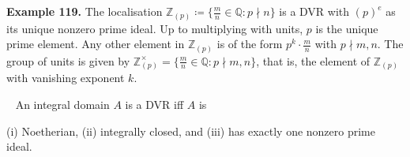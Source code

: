 \documentclass[12pt,a4paper,footinclude=true,headinclude=true]{scrbook} %
\newenvironment{proposition}[2][]
{\renewcommand\theinnercustomprop{#2}\innercustomprop[#1] 
\begin{mdframed}[backgroundcolor=gray!20]\ }
{\end{mdframed}\endinnercustomprop}
\newenvironment{example}[2][Example]
    { \begin{mdframed}[backgroundcolor=gray!20] \textbf{#1 #2.} }
    {  \end{mdframed}}
\begin{document}
\begin{example}{119}
    The localisation $\mathbb{Z}_{(p)}\coloneqq\{\frac{m}{n}\in\mathbb{Q}:p\nmid n\}$ is a DVR with $(p)^e$ as its unique nonzero prime ideal. Up to multiplying with units, $p$ is the unique prime element. Any other element in $\mathbb{Z}_{(p)}$ is of the form $p^k\cdot\frac{m}{n}$ with $p\nmid m,n$. The group of units is given by $\mathbb{Z}^\times_{(p)}=\{\frac{m}{n}\in\mathbb{Q}:p\nmid m,n\}$, that is, the element of $\mathbb{Z}_{(p)}$ with vanishing exponent $k$.
\end{example}

\begin{proposition}{120}
    An integral domain $A$ is a DVR iff $A$ is \\ \centerline{(i) Noetherian, (ii) integrally closed, and (iii) has exactly one nonzero prime ideal.}
\end{proposition}
\end{document}
